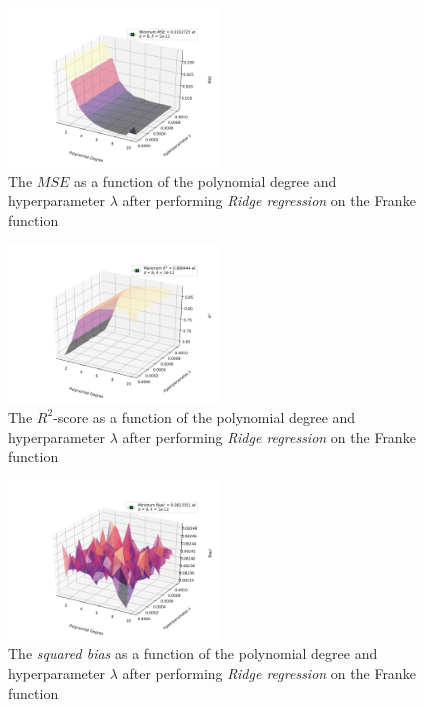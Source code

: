 \documentclass[a4paper,10pt,english]{article}
\begin{document}
\begin{figure}[H]
	\centering 
	\includegraphics[width = 0.5\textwidth, center]{../franke_output/part_D_2.png}
	\caption{The $MSE$ as a function of the polynomial degree and hyperparameter $\lambda$ after performing \textit{Ridge regression} on the Franke function}
	\label{part_d2}
\end{figure}

\begin{figure}[H]
	\centering 
	\includegraphics[width = 0.5\textwidth, center]{../franke_output/part_D_3.png}
	\caption{The $R^2$-score as a function of the polynomial degree and hyperparameter $\lambda$ after performing \textit{Ridge regression} on the Franke function}
	\label{part_d3}
\end{figure}

\begin{figure}[H]
	\centering 
	\includegraphics[width = 0.5\textwidth, center]{../franke_output/part_D_4.png}
	\caption{The \textit{squared bias} as a function of the polynomial degree and hyperparameter $\lambda$ after performing \textit{Ridge regression} on the Franke function}
	\label{part_d4}
\end{figure}
\end{document}
